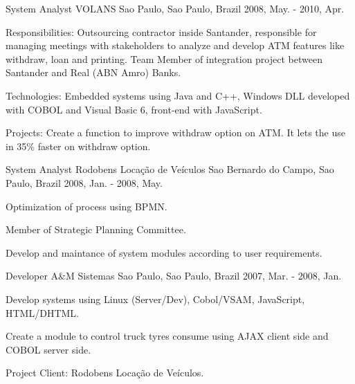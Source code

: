 \begin{cventries}
  \cventry
    {System Analyst} %
    {VOLANS} %
    {Sao Paulo, Sao Paulo, Brazil} %
    {2008, May. - 2010, Apr.} %
    {
      \begin{cvitems} %
        \item {Responsibilities: Outsourcing contractor inside Santander, responsible for managing meetings with stakeholders to analyze and develop ATM features like withdraw, loan and printing. Team Member of integration project between Santander and Real (ABN Amro) Banks.}
        \item {Technologies: Embedded systems using Java and C++, Windows DLL developed with COBOL and Visual Basic 6, front-end with JavaScript.}
        \item {Projects: Create a function to improve withdraw option on ATM. It lets the use in 35\% faster on withdraw option.}
      \end{cvitems}
    }

  \cventry
    {System Analyst} %
    {Rodobens Locação de Veículos} %
    {Sao Bernardo do Campo, Sao Paulo, Brazil} %
    {2008, Jan. - 2008, May.} %
    {
      \begin{cvitems} %
        \item {Optimization of process using BPMN.}
        \item {Member of Strategic Planning Committee.}
        \item {Develop and maintance of system modules according to user requirements.}
      \end{cvitems}
    }

  \cventry
    {Developer} %
    {A\&M Sistemas} %
    {Sao Paulo, Sao Paulo, Brazil} %
    {2007, Mar. - 2008, Jan.} %
    {
      \begin{cvitems} %
        \item {Develop systems using Linux (Server/Dev), Cobol/VSAM, JavaScript, HTML/DHTML.}
        \item {Create a module to control truck tyres consume using AJAX client side and COBOL server side.}
        \item {Project Client: Rodobens Locação de Veículos.}
      \end{cvitems}
    }


\end{cventries}
